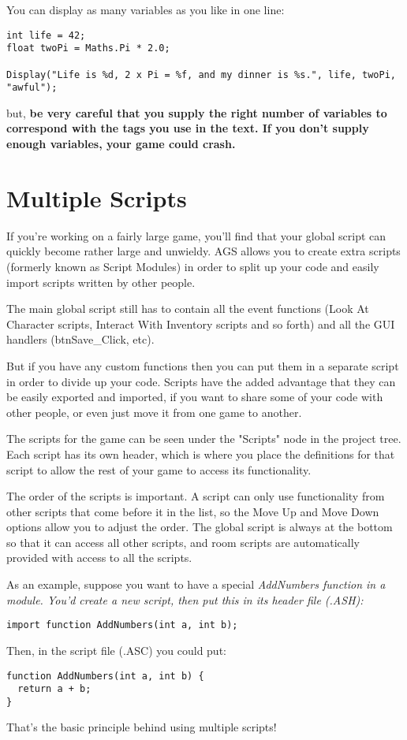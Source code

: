 You can display as many variables as you like in one line:
\begin{verbatim}
int life = 42;
float twoPi = Maths.Pi * 2.0;

Display("Life is %d, 2 x Pi = %f, and my dinner is %s.", life, twoPi, "awful");
\end{verbatim}
but, \bf{be very careful} that you supply the right number of variables to correspond
with the tags you use in the text. If you don't supply enough variables, your game could
crash.


\section{Multiple Scripts}\label{ScriptModules}%

If you're working on a fairly large game, you'll find that your global script can
quickly become rather large and unwieldy. AGS allows you to create extra scripts
(formerly known as Script Modules) in order to split up your code and easily
import scripts written by other people.

The main global script still has to contain all the event functions (Look At
Character scripts, Interact With Inventory scripts and so forth) and all the GUI
handlers (btnSave_Click, etc).

But if you have any custom functions then you can put them in a separate script in
order to divide up your code. Scripts have the added advantage that they can be
easily exported and imported, if you want to share some of your code with other
people, or even just move it from one game to another.

The scripts for the game can be seen under the "Scripts" node in the project tree. Each
script has its own header, which is where you place the 
definitions for that script to allow the rest of your game to access its functionality.

The order of the scripts is important. A script can only use functionality from other
scripts that come before it in the list, so the Move Up and Move Down options allow you
to adjust the order. The global script is always at the bottom so that it can access all
other scripts, and room scripts are automatically provided with access to all the scripts.

As an example, suppose you want to have a special \it{AddNumbers} function in a module.
You'd create a new script, then put this in its header file (.ASH):
\begin{verbatim}
import function AddNumbers(int a, int b);
\end{verbatim}
Then, in the script file (.ASC) you could put:
\begin{verbatim}
function AddNumbers(int a, int b) {
  return a + b;
}
\end{verbatim}
That's the basic principle behind using multiple scripts!

